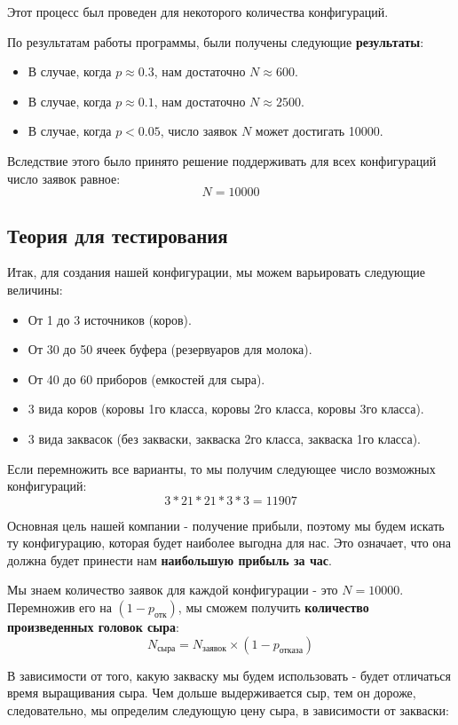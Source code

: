 \documentclass[a4paper, 14pt]{article}
\begin{document}
Этот процесс был проведен для некоторого количества конфигураций.

По результатам работы программы, были получены следующие \textbf{результаты}:

\begin{itemize}
	\item В случае, когда $p \approx 0.3$, нам достаточно $N \approx 600$.
	\item В случае, когда $p \approx 0.1$, нам достаточно $N \approx 2500$.
	\item В случае, когда $p < 0.05$, число заявок $N$ может достигать 10000.
\end{itemize}

Вследствие этого было принято решение поддерживать для всех конфигураций число заявок равное:
$$N = 10000$$

\subsection{Теория для тестирования}

Итак, для создания нашей конфигурации, мы можем варьировать следующие величины:

\begin{itemize}
	\item От 1 до 3 источников (коров).
	\item От 30 до 50 ячеек буфера (резервуаров для молока).
	\item От 40 до 60 приборов (емкостей для сыра).
	\item 3 вида коров (коровы 1го класса, коровы 2го класса, коровы 3го класса).
	\item 3 вида заквасок (без закваски, закваска 2го класса, закваска 1го класса).
\end{itemize}

Если перемножить все варианты, то мы получим следующее число возможных конфигураций:
$$3 * 21 * 21 * 3 * 3 = 11907$$

Основная цель нашей компании - получение прибыли, поэтому мы будем искать ту конфигурацию, которая будет наиболее выгодна для нас. Это означает, что она должна будет принести нам \textbf{наибольшую прибыль за час}.

Мы знаем количество заявок для каждой конфигурации - это $N = 10000$. Перемножив его на $(1-p_{\text{отк}})$, мы сможем получить \textbf{количество произведенных головок сыра}:
$$N_{\text{сыра}} = N_{\text{заявок}}\times(1-p_{\text{отказа}})$$

В зависимости от того, какую закваску мы будем использовать - будет отличаться время выращивания сыра. Чем дольше выдерживается сыр, тем он дороже, следовательно, мы определим следующую цену сыра, в зависимости от закваски:
\end{document}
